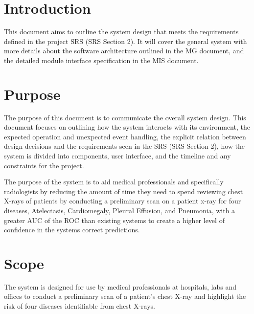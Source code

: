 \documentclass[12pt, titlepage]{article}
\begin{document}
\listoftables

\listoffigures

\newpage


\section{Introduction}
This document aims to outline the system design that meets the requirements defined in the project SRS (SRS Section 2).
It will cover the general system with more details about the software architecture outlined in the MG document, and the detailed module interface specification in the MIS document.

\section{Purpose}
The purpose of this document is to communicate the overall system design. This document focuses on outlining how the system interacts with its environment, the expected operation and unexpected event handling, the explicit relation between design decisions and the requirements seen in the SRS (SRS Section 2), how the system is divided into components, user interface, and the timeline and any constraints for the project.

The purpose of the system is to aid medical professionals and specifically radiologists by reducing the amount of time they need to spend reviewing chest X-rays of patients by conducting a preliminary scan on a patient x-ray for four diseases, Atelectasis, Cardiomegaly, Pleural Effusion, and Pneumonia, with a greater AUC of the ROC than existing systems to create a higher level of confidence in the systems correct predictions. 

\section{Scope}
The system is designed for use by medical professionals at hospitals, labs and offices to conduct a preliminary scan of a patient's chest X-ray and highlight the risk of four diseases identifiable from chest X-rays. 
\end{document}
